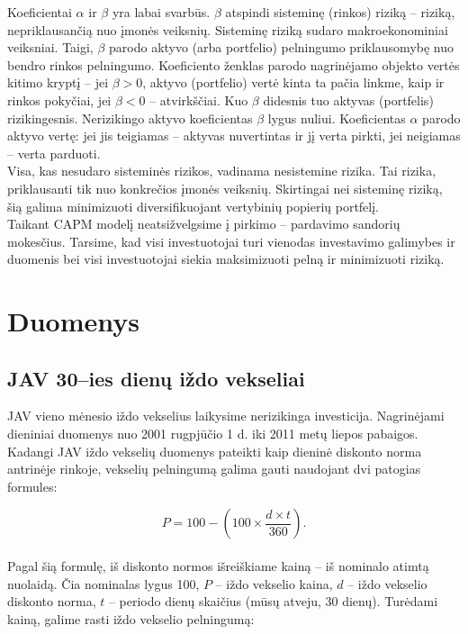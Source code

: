 \documentclass[12pt, a14paper, lithuanian]{article}
\begin{document}
Koeficientai $ \alpha $ ir $ \beta $ yra labai svarbūs. $ \beta $ atspindi sisteminę (rinkos) riziką -- riziką, nepriklausančią nuo įmonės veiksnių. Sisteminę riziką sudaro makroekonominiai veiksniai. Taigi, $ \beta $ parodo aktyvo (arba portfelio) pelningumo priklausomybę nuo bendro rinkos pelningumo. Koeficiento ženklas parodo nagrinėjamo objekto vertės kitimo kryptį -- jei $ \beta > 0 $, aktyvo (portfelio) vertė kinta ta pačia linkme, kaip ir rinkos pokyčiai, jei $ \beta < 0 $ -- atvirkščiai. Kuo $ \beta $  didesnis tuo aktyvas (portfelis) rizikingesnis. Nerizikingo aktyvo koeficientas $ \beta $ lygus nuliui. Koeficientas $ \alpha $ parodo aktyvo vertę: jei jis teigiamas -- aktyvas nuvertintas ir jį verta pirkti, jei neigiamas -- verta parduoti.\\

Visa, kas nesudaro sisteminės rizikos, vadinama nesistemine rizika. Tai rizika, priklausanti tik nuo konkrečios įmonės veiksnių. Skirtingai nei sisteminę riziką, šią galima minimizuoti diversifikuojant vertybinių popierių portfelį.\\

Taikant CAPM modelį neatsižvelgsime į pirkimo -- pardavimo sandorių mokesčius. Tarsime, kad visi investuotojai turi vienodas investavimo galimybes ir duomenis bei visi investuotojai siekia maksimizuoti pelną ir minimizuoti riziką.



\newpage
\section{Duomenys}
\subsection{JAV 30--ies dienų iždo vekseliai}

JAV vieno mėnesio iždo vekselius laikysime nerizikinga investicija. Nagrinėjami dieniniai duomenys nuo 2001 rugpjūčio 1 d. iki 2011 metų liepos pabaigos\cite{tbills}.
Kadangi JAV iždo vekselių duomenys pateikti kaip dieninė diskonto norma antrinėje rinkoje, vekselių pelningumą galima gauti naudojant dvi patogias formules:


$$P = 100 - \left( 100 \times \frac{d \times t}{360}\right) .$$\\

Pagal šią formulę, iš diskonto normos išreiškiame kainą -- iš nominalo atimtą nuolaidą. 
Čia nominalas lygus 100, $P$ -- iždo vekselio kaina, $d$ -- iždo vekselio diskonto norma,
$t$ -- periodo dienų skaičius (mūsų atveju, 30 dienų). 
Turėdami kainą, galime rasti iždo vekselio pelningumą:
\end{document}
